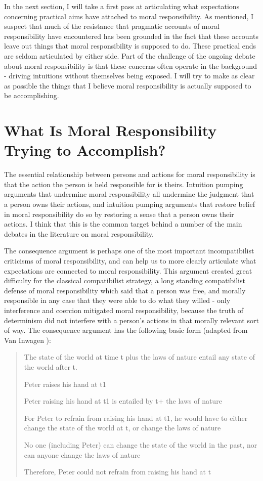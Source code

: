 \documentclass[phd,12pt,oneside,paper=letterpaper]{ubcthesis}
\begin{document}
In the next section, I will take a first pass at articulating what expectations concerning practical aims have attached to moral responsibility. As mentioned, I suspect that much of the resistance that pragmatic accounts of moral responsibility have encountered has been grounded in the fact that these accounts leave out things that moral responsibility is supposed to do.  These practical ends are seldom articulated by either side. Part of the challenge of the ongoing debate about moral responsibility is that these concerns often operate in the background - driving intuitions without themselves being exposed. I will try to make as clear as possible the things that I believe moral responsibility is actually supposed to be accomplishing.

\section{What Is Moral Responsibility Trying to Accomplish?}
The essential relationship between persons and actions for moral responsibility is that the action the person is held responsible for is theirs. Intuition pumping arguments that undermine moral responsibility all undermine the judgment that a person owns their actions, and intuition pumping arguments that restore belief in moral responsibility do so by restoring a sense that a person owns their actions. I think that this is the common target behind a number of the main debates in the literature on moral responsibility. 

The consequence argument is perhaps one of the most important incompatibilist criticisms of moral responsibility, and can help us to more clearly articulate what expectations are connected to moral responsibility. This argument created great difficulty for the classical compatibilist strategy, a long standing compatibilist defense of moral responsibility which said that a person was free, and morally responsible in any case that they were able to do what they willed - only interference and coercion mitigated moral responsibility, because the truth of determinism did not interfere with a person's actions in that morally relevant sort of way. The consequence argument has the following basic form (adapted from Van Inwagen \citeyearpar{inwagen1978}):

\begin{quote}
The state of the world at time t plus the laws of nature entail any state of the world after t. 

Peter raises his hand at t1

Peter raising his hand at t1 is entailed by t+ the laws of nature

For Peter to refrain from raising his hand at t1, he would have to either change the state of the world at t, or change the laws of nature

No one (including Peter) can change the state of the world in the past, nor can anyone change the laws of nature

Therefore, Peter could not refrain from raising his hand at t
\end{quote}
\end{document}
